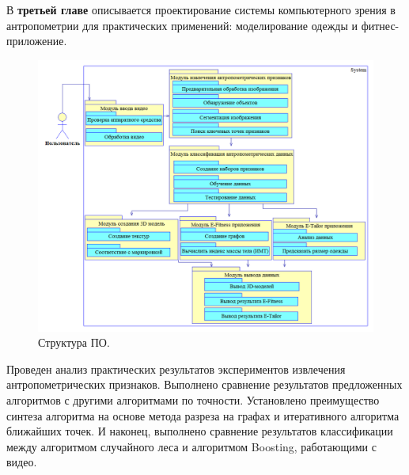 В \textbf {третьей главе} описывается проектирование системы компьютерного зрения в антропометрии для практических применений: моделирование одежды и фитнес-приложение. 
\begin{figure}[ht!]
\centering
\includegraphics [width=0.95\linewidth]{images/h35.png}
\begin{center}
\caption{Структура ПО.} \label{img35}
\end{center}
\end{figure}

Проведен анализ практических результатов экспериментов извлечения антропометрических признаков. Выполнено сравнение результатов предложенных алгоритмов с другими алгоритмами по точности. Установлено преимущество синтеза алгоритма на основе метода разреза на графах и итеративного алгоритма ближайших точек. И наконец, выполнено сравнение результатов классификации между алгоритмом случайного леса и алгоритмом Boosting, работающими с видео.

